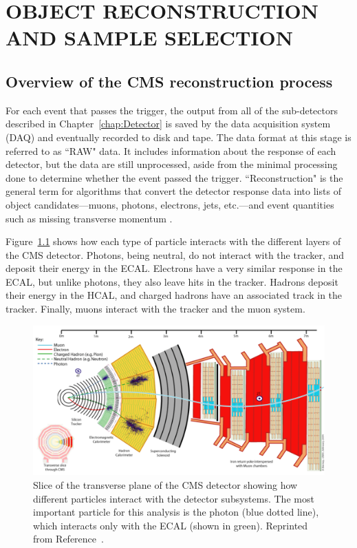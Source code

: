 \chapter{OBJECT RECONSTRUCTION AND SAMPLE SELECTION}
\label{sec:EventReconstruction}

\section{Overview of the CMS reconstruction process}
\label{sec:recoOverview}

For each event that passes the trigger, the output from all of the sub-detectors described in Chapter~\ref{chap:Detector} is saved by the data acquisition system (DAQ) and eventually recorded to disk and tape. The data format at this stage is referred to as ``RAW" data. It includes information about the response of each detector, but the data are still unprocessed, aside from the minimal processing done to determine whether the event passed the trigger. ``Reconstruction" is the general term for algorithms that convert the detector response data into lists of object candidates---muons, photons, electrons, jets, etc.---and event quantities such as missing transverse momentum \ptmiss. 

Figure~\ref{fig:cmsSlice} shows how each type of particle interacts with the different layers of the CMS detector. Photons, being neutral, do not interact with the tracker, and deposit their energy in the ECAL. Electrons have a very similar response in the ECAL, but unlike photons, they also leave hits in the tracker. Hadrons deposit their energy in the HCAL, and charged hadrons have an associated track in the tracker. Finally, muons interact with the tracker and the muon system. 

 \begin{figure}[h!]
	\centering
	\includegraphics[width=\linewidth]{Figures/EventReconstruction/cms_slice.pdf}
       \caption{Slice of the transverse plane of the CMS detector showing how different particles interact with the detector subsystems. The most important particle for this analysis is the photon (blue dotted line), which interacts only with the ECAL (shown in green).
       Reprinted from Reference~\cite{CDS}.}
       \label{fig:cmsSlice}
\end{figure}

